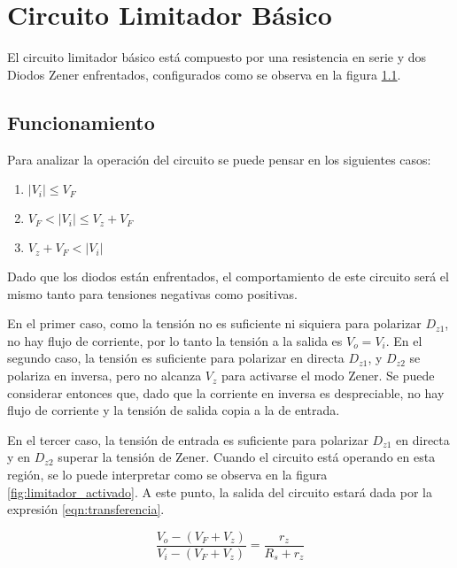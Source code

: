 \chapter{Circuito Limitador Básico}
El circuito limitador básico está compuesto por una resistencia en serie y dos Diodos Zener enfrentados, configurados como se observa en la figura \ref{fig:limitador_basico}.

\begin{figure}[ht]
    \begin{center}
        
        \label{fig:limitador_basico}
    \end{center}
\end{figure}

\section{Funcionamiento}
Para analizar la operación del circuito se puede pensar en los siguientes casos:

\begin{enumerate}
    \item $|V_i| \leq V_F$
    \item $V_F < |V_i| \leq V_z + V_F$
    \item $V_z + V_F < |V_i|$ 
\end{enumerate}

Dado que los diodos están enfrentados, el comportamiento de este circuito será el mismo tanto para tensiones negativas como positivas.

En el primer caso, como la tensión no es suficiente ni siquiera para polarizar $D_{z1}$, no hay flujo de corriente, por lo tanto la tensión a la salida es $V_o = V_i$. En el segundo caso, la tensión es suficiente para polarizar en directa $D_{z1}$, y $D_{z2}$ se polariza en inversa, pero no alcanza $V_z$ para activarse el modo Zener. Se puede considerar entonces que, dado que la corriente en inversa es despreciable, no hay flujo de corriente y la tensión de salida copia a la de entrada.

En el tercer caso, la tensión de entrada es suficiente para polarizar $D_{z1}$ en directa y en $D_{z2}$ superar la tensión de Zener. Cuando el circuito está operando en esta región, se lo puede interpretar como se observa en la figura \ref{fig:limitador_activado}. A este punto, la salida del circuito estará dada por la expresión \eqref{eqn:transferencia}.

\begin{equation}
    \frac{V_o - (V_F + V_z)}{V_i - (V_F + V_z)}=\frac{r_z}{R_s + r_z}
    \label{eqn:transferencia}
\end{equation}

